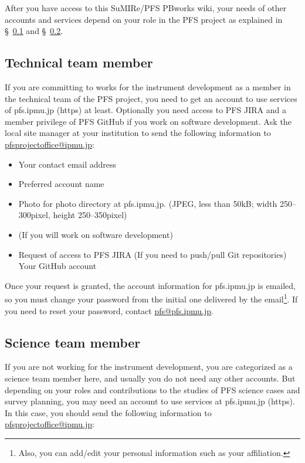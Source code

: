\documentclass[a4paper,notitlepage]{article}
\begin{document}
After you have access to this SuMIRe/PFS PBworks wiki, your needs of
other accounts and services depend on your role in the PFS project as
explained in \S~\ref{subsec:techmem} and  \S~\ref{subsec:scimem}.

\subsection{Technical team member}
\label{subsec:techmem}

If you are committing to works for the instrument development as a
member in the technical team of the PFS project, you need to get an
account to use services of pfs.ipmu.jp (https) at least. Optionally
you need access to PFS JIRA and a member privilege of PFS GitHub if
you work on software development. Ask the local site manager at your
institution to send the following information to
\url{pfsprojectoffice@ipmu.jp}:

\begin{itemize}
\item Your contact email address
\item Preferred account name
\item Photo for photo directory at pfs.ipmu.jp. (JPEG, less than 50kB;
  width 250--300pixel, height 250--350pixel)
\item (If you will work on software development)
\item Request of access to PFS JIRA (If you need to push/pull Git
  repositories) Your GitHub account
\end{itemize}

Once your request is granted, the account information for pfs.ipmu.jp
is emailed, so you must change your password from the initial one
delivered by the email\footnote{Also, you can add/edit your personal
  information such as your affiliation.}.  If you need to reset your
password, contact \url{pfs@pfs.ipmu.jp}.

\subsection{Science team member}
\label{subsec:scimem}

If you are not working for the instrument development, you are
categorized as a science team member here, and usually you do not need
any other accounts. But depending on your roles and contributions to
the studies of PFS science cases and survey planning, you may need an
account to use services at pfs.ipmu.jp (https). In this case, you
should send the following information to
\url{pfsprojectoffice@ipmu.jp}:
\end{document}
